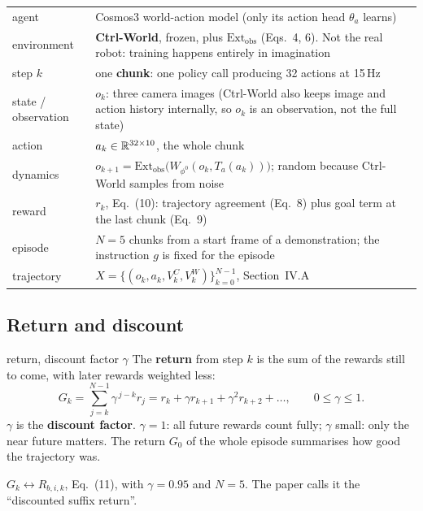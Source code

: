 \begin{paperlink}
\begin{tabular}{@{}l p{11.2cm}@{}}
agent & Cosmos3 world-action model (only its action head $\theta_a$ learns)\\
environment & \textbf{Ctrl-World}, frozen, plus $\mathrm{Ext}_{\mathrm{obs}}$ (Eqs.~4, 6). Not the real robot: training happens entirely in imagination\\
step $k$ & one \textbf{chunk}: one policy call producing 32 actions at 15\,Hz\\
state / observation & $o_k$: three camera images (Ctrl-World also keeps image and action history internally, so $o_k$ is an observation, not the full state)\\
action & $a_k\in\mathbb{R}^{32\times10}$, the whole chunk\\
dynamics & $o_{k+1}=\mathrm{Ext}_{\mathrm{obs}}\big(W_{\phi^0}(o_k,T_a(a_k))\big)$; random because Ctrl-World samples from noise\\
reward & $r_k$, Eq.~(10): trajectory agreement (Eq.~8) plus goal term at the last chunk (Eq.~9)\\
episode & $N=5$ chunks from a start frame of a demonstration; the instruction $g$ is fixed for the episode\\
trajectory & $X=\{(o_k,a_k,V^C_k,V^W_k)\}_{k=0}^{N-1}$, Section~IV.A\\
\end{tabular}
\end{paperlink}

\subsection{Return and discount}
\begin{newc}{return, discount factor $\gamma$}
The \textbf{return} from step $k$ is the sum of the rewards still to come, with later rewards weighted less:
\[G_k=\sum_{j=k}^{N-1}\gamma^{\,j-k}r_j=r_k+\gamma r_{k+1}+\gamma^2r_{k+2}+\dots,\qquad 0\le\gamma\le1.\]
$\gamma$ is the \textbf{discount factor}. $\gamma=1$: all future rewards count fully; $\gamma$ small: only the near future matters. The return $G_0$ of the whole episode summarises how good the trajectory was.
\end{newc}
\begin{paperlink}
$G_k\leftrightarrow R_{b,i,k}$, Eq.~(11), with $\gamma=0.95$ and $N=5$. The paper calls it the ``discounted suffix return''.
\end{paperlink}


